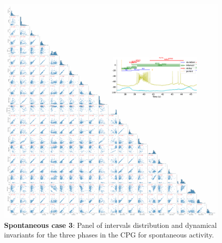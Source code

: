 \begin{figure}[htbp]
	\centering
	\includegraphics[width=\textwidth]{./invariants/data/SUSSEX/prep1/images/3phases/panel_with_pairplot.pdf}
	\caption{\textbf{Spontaneous case 3}: Panel of intervals distribution and dynamical invariants for the three phases in the CPG for spontaneous activity.}
	\label{fig:prep1 invariants pairplot}
\end{figure}

%





